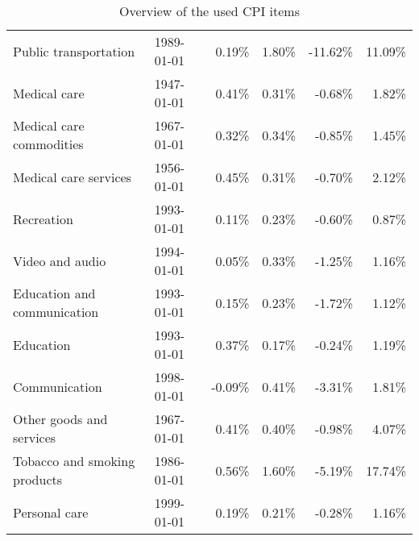 \documentclass[12pt]{article}
\begin{document}
\begin{adjustwidth}{-2cm}{}
\begin{table}
\begin{tabular}{llrrrr}
\hspace*{8ex}Public transportation & 1989-01-01 & 0.19\% & 1.80\% & -11.62\% & 11.09\% \\
\hspace*{4ex}Medical care & 1947-01-01 & 0.41\% & 0.31\% & -0.68\% & 1.82\% \\
\hspace*{8ex}Medical care commodities & 1967-01-01 & 0.32\% & 0.34\% & -0.85\% & 1.45\% \\
\hspace*{8ex}Medical care services & 1956-01-01 & 0.45\% & 0.31\% & -0.70\% & 2.12\% \\
\hspace*{4ex}Recreation & 1993-01-01 & 0.11\% & 0.23\% & -0.60\% & 0.87\% \\
\hspace*{8ex}Video and audio & 1994-01-01 & 0.05\% & 0.33\% & -1.25\% & 1.16\% \\
\hspace*{4ex}Education and communication & 1993-01-01 & 0.15\% & 0.23\% & -1.72\% & 1.12\% \\
\hspace*{8ex}Education & 1993-01-01 & 0.37\% & 0.17\% & -0.24\% & 1.19\% \\
\hspace*{8ex}Communication & 1998-01-01 & -0.09\% & 0.41\% & -3.31\% & 1.81\% \\
\hspace*{4ex}Other goods and services & 1967-01-01 & 0.41\% & 0.40\% & -0.98\% & 4.07\% \\
\hspace*{8ex}Tobacco and smoking products & 1986-01-01 & 0.56\% & 1.60\% & -5.19\% & 17.74\% \\
\hspace*{8ex}Personal care & 1999-01-01 & 0.19\% & 0.21\% & -0.28\% & 1.16\% \\
\end{tabular}



\caption{Overview of the used CPI items}
\label{table:overview}
\end{table}
\end{adjustwidth}
\end{document}
